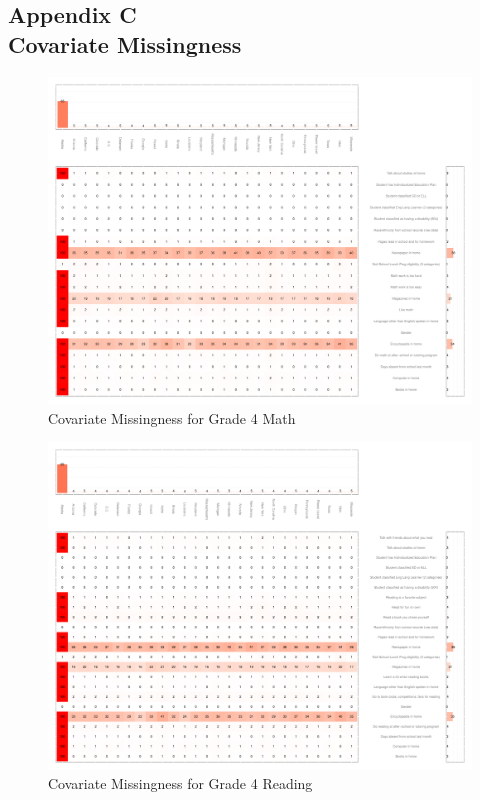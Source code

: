 \documentclass[letterpaper,12p,twoside]{article} %
\begin{document}
\clearpage
{}
\subsection*{Appendix C\\Covariate Missingness}
\label{appendixmissing}

\begin{figure}[h]
\begin{center}
\includegraphics[width=\textwidth]{../Figures2009/g4math-missing.pdf}
\caption{Covariate Missingness for Grade 4 Math}
\label{fig:g4math:missing}
\end{center}
\end{figure}

\begin{figure}[h]
\begin{center}
\includegraphics[width=\textwidth]{../Figures2009/g4read-missing.pdf}
\caption{Covariate Missingness for Grade 4 Reading}
\label{fig:g4reading:missing}
\end{center}
\end{figure}
\end{document}

